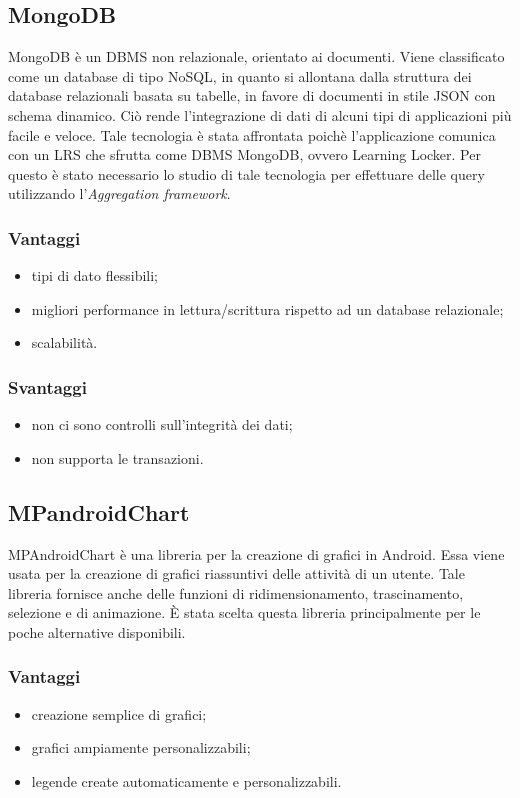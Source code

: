 \documentclass[../Tesi.tex]{subfiles}
\begin{document}
	\subsection{MongoDB}
	MongoDB è un DBMS non relazionale, orientato ai documenti. Viene classificato come un database
	di tipo NoSQL, in quanto si allontana dalla struttura dei database relazionali basata su tabelle, in favore di documenti in stile JSON con schema dinamico. Ciò rende l’integrazione di dati di alcuni tipi di applicazioni più facile e veloce. Tale tecnologia è stata affrontata poichè l'applicazione comunica con un LRS che sfrutta come DBMS MongoDB, ovvero Learning Locker. Per questo è stato necessario lo studio di tale tecnologia per effettuare delle query utilizzando l'\textit{Aggregation framework}. 
		\subsubsection{Vantaggi}
			\begin{itemize}
				\item tipi di dato flessibili;
				\item migliori performance in lettura/scrittura rispetto ad un database relazionale;
				\item scalabilità.
			\end{itemize}
		\subsubsection{Svantaggi}
			\begin{itemize}
				\item non ci sono controlli sull'integrità dei dati;
				\item non supporta le transazioni.
			\end{itemize}

	\subsection{MPandroidChart}
		MPAndroidChart è una libreria per la creazione di grafici in Android. Essa viene usata per la creazione di grafici riassuntivi delle attività di un utente. Tale libreria fornisce anche delle funzioni di ridimensionamento, trascinamento, selezione e di animazione. È stata scelta questa libreria principalmente per le poche alternative disponibili.
		\subsubsection{Vantaggi}
			\begin{itemize}
				\item creazione semplice di grafici;
				\item grafici ampiamente personalizzabili;
				\item legende create automaticamente e personalizzabili.
			\end{itemize}
\end{document}
